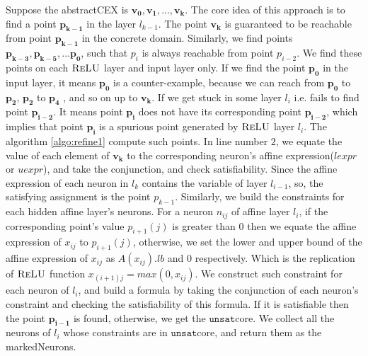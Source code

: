 Suppose the abstractCEX is $\boldsymbol{v_0}, \boldsymbol{v_1}, ... , \boldsymbol{v_k}$. 
The core idea of this approach is to find a point $\boldsymbol{p_{k-1}}$ in the layer $l_{k-1}$. 
The point $\boldsymbol{v_k}$ is guaranteed to be reachable from point $\boldsymbol{p_{k-1}}$ in the concrete domain.
Similarly, we find points $\boldsymbol{p_{k-3}}, \boldsymbol{p_{k-5}}, ... \boldsymbol{p_0}$, 
such that $p_i$ is always reachable from point $p_{i-2}$. 
We find these points on each $\textsc{ReLU}${} layer and input layer only. 
If we find the point $\boldsymbol{p_0}$ in the input layer, it means $\boldsymbol{p_0}$ is a counter-example, 
because we can reach from $\boldsymbol{p_0}$ to $\boldsymbol{p_2}$, $\boldsymbol{p_2}$ to $\boldsymbol{p_4}$ 
, and so on up to $\boldsymbol{v_k}$. 
If we get stuck in some layer $l_i$ i.e. fails to find point 
$\boldsymbol{p_{i-2}}$. It means point $\boldsymbol{p_i}$ does not have its corresponding point $\boldsymbol{p_{i-2}}$, 
which implies that point $\boldsymbol{p_i}$ is a spurious point generated by $\textsc{ReLU}${} layer $l_i$. 
The algorithm \ref{algo:refine1} compute such points. In line number $2$, we equate the value of 
each element of $\boldsymbol{v_k}$ to the corresponding neuron's affine expression($lexpr$ or $uexpr$), 
and take the conjunction, and check satisfiability. Since the affine expression of each neuron in $l_k$ contains the 
variable of layer $l_{i-1}$, so, the satisfying assignment is the point $p_{k-1}$. Similarly, we build the constraints
for each hidden affine layer's neurons. For a neuron $n_{ij}$ of affine layer $l_i$, 
if the corresponding point's value $p_{i+1}(j)$ is greater than $0$ then we equate the affine expression of $x_{ij}$ to $p_{i+1}(j)$,
otherwise, we set the lower and upper bound of the affine expression of $x_{ij}$ as $A(x_{ij}).lb$ and $0$ respectively. 
Which is the replication of $\textsc{ReLU}${} function $x_{(i+1)j} = max(0, x_{ij})$. We construct such constraint 
for each neuron of $l_i$, and build a formula by taking the conjunction
of each neuron’s constraint and checking the satisfiability of this formula.
If it is satisfiable then the point $\boldsymbol{p_{i-1}}$ is found, 
otherwise, we get the $\mathtt{unsat}$core. We collect all the neurons of $l_i$ whose constraints are 
in $\mathtt{unsat}$core, and return them as the markedNeurons.   



